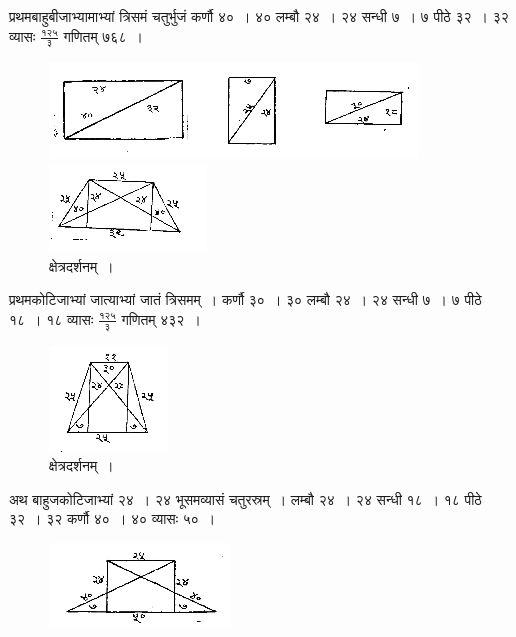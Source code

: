 \documentclass[11pt, openany]{book}
\begin{document}
प्रथमबाहुबीजाभ्यामाभ्यां त्रिसमं चतुर्भुजं कर्णौ ४०~। ४० लम्बौ
२४~। २४ सन्धी ७~। ७ पीठे ३२~। ३२ व्यासः $\frac{\mbox{१२५}}{\mbox{३}}$ गणितम् ७६८~। 
 \vspace{-2mm}

\begin{figure}[h!]
    \centering
    \includegraphics[scale=0.85]{graphics/capture108.png}
      \captionsetup{labelformat=empty}
 \caption{क्षेत्रदर्शनम्~।}
 \includegraphics[scale=0.85]{graphics/capture109.png}
\end{figure}
 \vspace{-2mm}

प्रथमकोटिजाभ्यां जात्याभ्यां जातं त्रिसमम्~। कर्णौ ३०~। ३० लम्बौ
२४~। २४ सन्धी ७~। ७ पीठे १८~। १८ व्यासः $\frac{\mbox{१२५}}{\mbox{३}}$ गणितम् ४३२~। 
\newpage
\begin{figure}[h!]
    \centering
      \captionsetup{labelformat=empty}
 \caption{क्षेत्रदर्शनम्~।}
 \vspace{-2mm}

 \includegraphics[scale=0.9]{graphics/capture110.png}
\end{figure}
 \vspace{-2mm}

अथ बाहुजकोटिजाभ्यां २४~। २४ भूसमव्यासं चतुरस्रम्~। लम्बौ २४~। २४ सन्धी
१८~। १८ पीठे ३२~। ३२ कर्णौ ४०~। ४० व्यासः ५०~। 
 \vspace{-2mm}

\begin{figure}[h!]
    \centering
    \includegraphics[scale=0.9]{graphics/capture111.png}
\end{figure}
 \vspace{-2mm}
\end{document}
